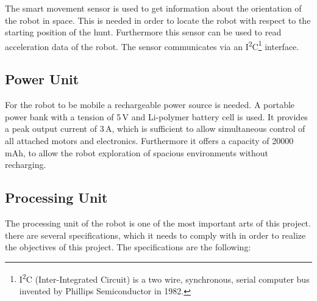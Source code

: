The smart movement sensor is used to get information about the orientation of the robot in space. This is needed in order to locate the robot with respect to the starting position of the hunt. Furthermore this sensor can be used to read acceleration data of the robot. The sensor communicates via an I\textsuperscript{2}C\footnote{I\textsuperscript{2}C (Inter-Integrated Circuit) is a two wire, synchronous, serial computer bus invented by Phillips Semiconductor in 1982.} interface.

\subsection{Power Unit}\label{subsec:power_unit}

For the robot to be mobile a rechargeable power source is needed. A portable power bank with a tension of 5\,V and Li-polymer battery cell is used. It provides a peak output current of 3\,A, which is sufficient to allow simultaneous control of all attached motors and electronics. Furthermore it offers a capacity of 20000\,mAh, to allow the robot exploration of spacious environments without recharging.

\subsection{Processing Unit}\label{subsec:processing_unit}

The processing unit of the robot is one of the most important arts of this project. there are several specifications, which it needs to comply with in order to realize the objectives of this project. The specifications are the following:

